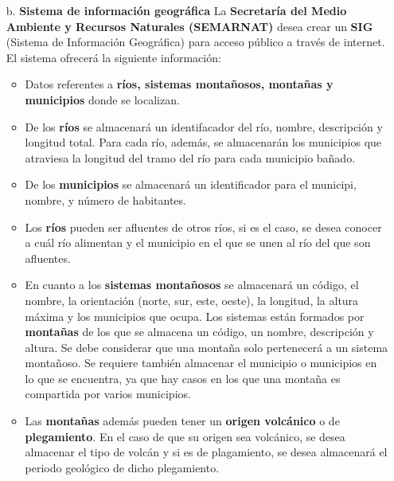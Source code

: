 \documentclass[letterpaper,11pt]{article}
\begin{document}
\begin{itemize}
    \item[b.] \textbf{Sistema de información geográfica}
    La \textbf{Secretaría del Medio Ambiente y Recursos Naturales (SEMARNAT)}
    desea crear un \textbf{SIG} (Sistema de Información Geográfica) para acceso
    público a través de internet. El sistema ofrecerá la siguiente información:

    \begin{itemize}
        \item Datos referentes a \textbf{ríos, sistemas montañosos, montañas y
              municipios} donde se localizan.
        \item De los \textbf{ríos} se almacenará un identifacador del río, nombre,
              descripción y longitud total. Para cada río, además, se almacenarán
              los municipios que atraviesa la longitud del tramo del río para cada
              municipio bañado.
        \item De los \textbf{municipios} se almacenará un identificador para
              el municipi, nombre, y número de habitantes.
        \item Los \textbf{ríos} pueden ser afluentes de otros ríos, si es el caso,
              se desea conocer a cuál río alimentan y el municipio en el que se unen
              al río del que son afluentes.
        \item En cuanto a los \textbf{sistemas montañosos} se almacenará un código,
              el nombre, la orientación (norte, sur, este, oeste), la longitud, la
              altura máxima y los municipios que ocupa. Los sistemas están formados
              por \textbf{montañas} de los que se almacena un código, un nombre,
              descripción y altura. Se debe considerar que una montaña solo
              pertenecerá a un sistema montañoso. Se requiere también almacenar
              el municipio o municipios en lo que se encuentra, ya que hay casos
              en los que una montaña es compartida por varios municipios.
        \item Las \textbf{montañas} además pueden tener un \textbf{origen volcánico}
              o de \textbf{plegamiento}. En el caso de que su origen sea volcánico,
              se desea almacenar el tipo de volcán y si es de plagamiento, se desea
              almacenará el periodo geológico de dicho plegamiento.


\end{itemize}
\end{itemize}
\end{document}
